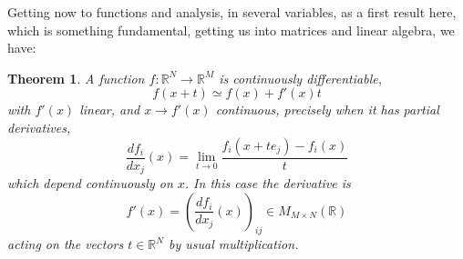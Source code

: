 \documentclass[12pt]{amsbook}
\newtheorem{theorem}{Theorem}[chapter]
\begin{document}
Getting now to functions and analysis, in several variables, as a first result here, which is something fundamental, getting us into matrices and linear algebra, we have:


\begin{theorem}
A function $f:\mathbb R^N\to\mathbb R^M$ is continuously differentiable,
$$f(x+t)\simeq f(x)+f'(x)t$$
with $f'(x)$ linear, and $x\to f'(x)$ continuous, precisely when it has partial derivatives,
$$\frac{df_i}{dx_j}(x)=\lim_{t\to 0}\frac{f_i(x+te_j)-f_i(x)}{t}$$
which depend continuously on $x$. In this case the derivative is
$$f'(x)=\left(\frac{df_i}{dx_j}(x)\right)_{ij}\in M_{M\times N}(\mathbb R)$$ 
acting on the vectors $t\in\mathbb R^N$ by usual multiplication.
\end{theorem}
\end{document}
